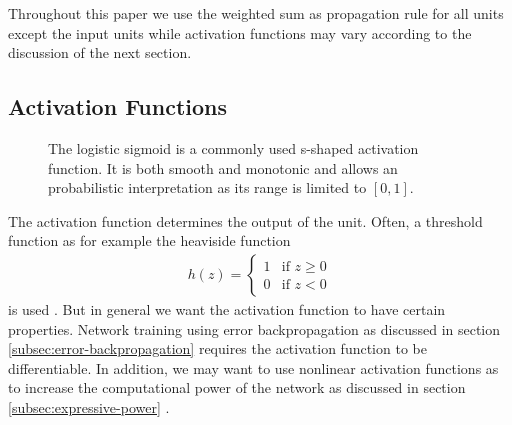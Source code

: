 Throughout this paper we use the weighted sum as propagation rule for all units except the input units while activation functions may vary according to the discussion of the next section.


\subsection{Activation Functions}

\begin{SCfigure}[\sidecaptionrelwidth][b!]
	\centering
    	\caption[The logistic sigmoid as activation function.]{The logistic sigmoid is a commonly used s-shaped activation function. It is both smooth and monotonic and allows an probabilistic interpretation as its range is limited to $[0,1]$.}
    	\label{fig:logistic-sigmoid}
\end{SCfigure}

The activation function determines the output of the unit. Often, a threshold function as for example the heaviside function
\begin{align}
h(z) = 
\begin{cases}
1  & \text{if } z \geq 0\\
0 & \text{if } z < 0
\end{cases}
\end{align}
is used \cite[p.~34-37]{Haykin:2005}. But in general we want the activation function to have certain properties. Network training using error backpropagation as discussed in section \ref{subsec:error-backpropagation} requires the activation function to be differentiable. In addition, we may want to use nonlinear activation functions as to increase the computational power of the network as discussed in section \ref{subsec:expressive-power} \cite[p.~307-308]{DudaHartStork:2001}.

